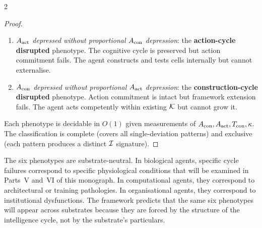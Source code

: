 \begin{multicols}{2}
\begin{proof}
\begin{enumerate}[label=\textbf{(P\arabic*)}]
\item \emph{$A_{\mathrm{act}}$ depressed without proportional $A_{\mathrm{con}}$ depression}: the
  \textbf{action-cycle disrupted} phenotype. The cognitive cycle is preserved but action
  commitment fails. The agent constructs and tests cells internally but cannot externalise.

\item \emph{$A_{\mathrm{con}}$ depressed without proportional $A_{\mathrm{act}}$ depression}: the
  \textbf{construction-cycle disrupted} phenotype. Action commitment is intact but
  framework extension fails. The agent acts competently within existing $\mathcal{K}$ but
  cannot grow it.
\end{enumerate}

Each phenotype is decidable in $O(1)$ given measurements of $A_{\mathrm{con}}, A_{\mathrm{act}}, T_{\mathrm{con}}, \kappa$.
The classification is complete (covers all single-deviation patterns) and exclusive
(each pattern produces a distinct $\mathcal{I}$ signature).
\end{proof}

\begin{remark}
The six phenotypes are substrate-neutral. In biological agents, specific cycle failures
correspond to specific physiological conditions that will be examined in Parts~V and~VI
of this monograph. In computational agents, they correspond to architectural or training
pathologies. In organisational agents, they correspond to institutional dysfunctions.
The framework predicts that the same six phenotypes will appear across substrates because
they are forced by the structure of the intelligence cycle, not by the substrate's
particulars.
\end{remark}

\end{multicols}

